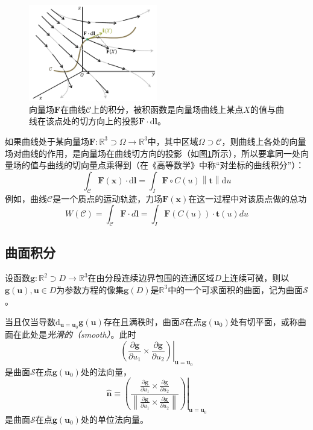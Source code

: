 \documentclass[../main.tex]{subfiles}
\begin{document}
\begin{figure}[ht]
    \centering
    \includegraphics[width=0.5\textwidth]{images/line_integral.pdf}
    \caption{向量场$\mathbf{F}$在曲线$\mathcal{C}$上的积分，被积函数是向量场曲线上某点$X$的值与曲线在该点处的切方向上的投影$\mathbf{F}\cdot\mathrm{d}\mathbf{l}$。}
    \label{fig:II.5.4}
\end{figure}

如果曲线处于某向量场$\mathbf{F}:\mathbb{R}^3\supset\Omega\rightarrow\mathbb{R}^3$中，其中区域$\Omega\supset\mathcal{C}$，则曲线上各处的向量场对曲线的作用，是向量场在曲线切方向的投影（如图\ref{fig:II.5.4}所示），所以要拿同一处向量场的值与曲线的切向量点乘得到（在《高等数学》中称“对坐标的曲线积分”\cite[\S 9.2]{华工高数2009下}）：
\[\int_\mathcal{C}\mathbf{F}\left(\mathbf{x}\right)\cdot \mathrm{d}\mathbf{l}=\int_I \mathbf{F}\circ C\left(u\right)\left\|\mathbf{t}\right\|\mathrm{d}u\]
例如，曲线$\mathcal{C}$是一个质点的运动轨迹，力场$\mathbf{F}\left(\mathbf{x}\right)$在这一过程中对该质点做的总功
\[W\left(\mathcal{C}\right)=\int_\mathcal{C}\mathbf{F}\cdot d\mathbf{l}=\int_I\mathbf{F}\left(C\left(u\right)\right)\cdot\mathbf{t}\left(u\right)du
\]

\subsection{曲面积分}
设函数$\mathbf{g}:\mathbb{R}^2\supset D\rightarrow\mathbb{R}^3$在由分段连续边界包围的连通区域$D$上连续可微，则以$\mathbf{g}\left(\mathbf{u}\right),\mathbf{u}\in D$为参数方程的像集$\mathbf{g}\left(D\right)$是$\mathbb{R}^3$中的一个可求面积的曲面，记为曲面$\mathcal{S}$。

当且仅当导数$\mathrm{d}_{\mathbf{u}=\mathbf{u}_0}\mathbf{g}\left(\mathbf{u}\right)$存在且满秩时，曲面$\mathcal{S}$在点$\mathbf{g}\left(\mathbf{u}_0\right)$处有切平面，或称曲面在此处是\emph{光滑的（smooth）}。此时
\[
    \left.\left(\frac{\partial \mathbf{g}}{\partial u_1}\times\frac{\partial \mathbf{g}}{\partial u_2}\right)\right|_{\mathbf{u}=\mathbf{u}_0}
\]
是曲面$\mathcal{S}$在点$\mathbf{g}\left(\mathbf{u}_0\right)$处的法向量，
\[
    \mathbf{\hat{n}}\equiv\left.\left(\frac{\frac{\partial \mathbf{g}}{\partial u_1}\times\frac{\partial\mathbf{g}}{\partial u_2}}{\left\|\frac{\partial\mathbf{g}}{\partial u_1}\times\frac{\partial\mathbf{g}}{\partial u_2}\right\|}\right)\right|_{\mathbf{u}=\mathbf{u}_0}
\]
是曲面$\mathcal{S}$在点$\mathbf{g}\left(\mathbf{u}_0\right)$处的单位法向量。
\end{document}

